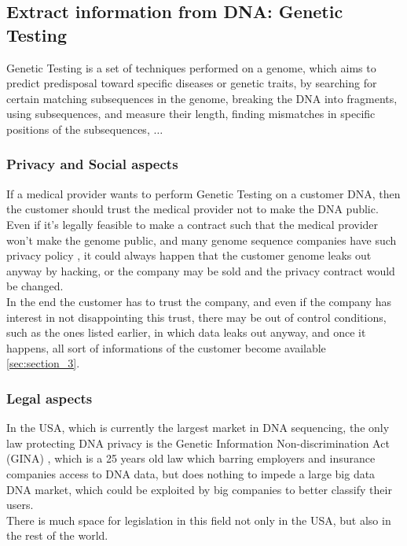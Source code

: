 \documentclass[12pt]{article}
\begin{document}
\subsection{Extract information from DNA: Genetic Testing}
Genetic Testing is a set of techniques performed on a genome, which aims to predict predisposal toward specific diseases or genetic traits, by searching for certain matching subsequences in the genome, breaking the DNA into fragments, using subsequences, and measure their length, finding mismatches in specific positions of the subsequences, $\dots$
\subsubsection{Privacy and Social aspects}
If a medical provider wants to perform Genetic Testing on a customer DNA, then the customer should trust the medical provider not to make the DNA public. Even if it's legally feasible to make a contract such that the medical provider won't make the genome public, and many genome sequence companies have such privacy policy \cite{veritas_privacy}, it could always happen that the customer genome leaks out anyway by hacking, or the company may be sold and the privacy contract would be changed.\\
In the end the customer has to trust the company, and even if the company has interest in not disappointing this trust, there may be out of control conditions, such as the ones listed earlier, in which data leaks out anyway, and once it happens, all sort of informations of the customer become available \ref{sec:section_3}.
\subsubsection{Legal aspects}
In the USA, which is currently the largest market in DNA sequencing, the only law protecting DNA privacy is the Genetic Information Non-discrimination Act (GINA) \cite{GINA}, which is a 25 years old law which barring employers and insurance companies access to DNA data, but does nothing to impede a large big data DNA market, which could be exploited by big companies to better classify their users.\\
There is much space for legislation in this field not only in the USA, but also in the rest of the world.
\end{document}

